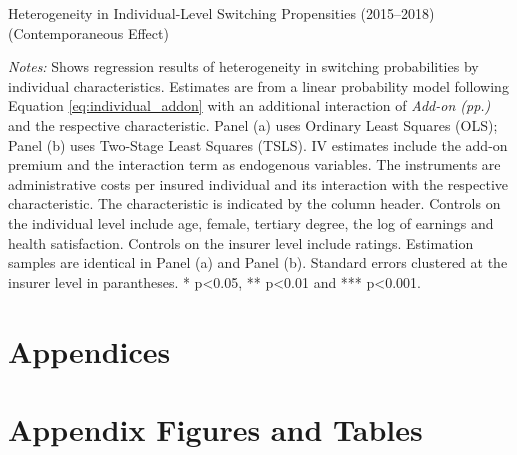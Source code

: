 \documentclass[a4paper, 11pt, english]{article}
\begin{document}
\begin{table}
	\captionsetup{justification=centering}
	\caption{Heterogeneity in Individual-Level Switching Propensities (2015--2018) \\ (Contemporaneous Effect)}
	
	\label{tab:individual15cont_het}
	\begin{minipage}{\textwidth}
		\vspace{3pt}
		\footnotesize \textit{Notes:} Shows regression results of heterogeneity in switching probabilities by individual characteristics. 
		Estimates are from a linear probability model following Equation \eqref{eq:individual_addon} with an additional interaction of \textit{Add-on (pp.)} and the respective characteristic. 
		Panel (a) uses Ordinary Least Squares (OLS); Panel (b) uses Two-Stage Least Squares (TSLS). IV estimates include the add-on premium and the interaction term as endogenous variables. The instruments are administrative costs per insured individual and its interaction with the respective characteristic. 
		The characteristic is indicated by the column header. Controls on the individual level include age, female, tertiary degree, the log of earnings and health satisfaction.  Controls on the insurer level include ratings. 
		Estimation samples are identical in Panel (a) and Panel (b). 
		Standard errors clustered at the insurer level in parantheses. * p<0.05, **  p<0.01 and *** p<0.001. 
	\end{minipage}
\end{table}
	
\clearpage 
\newpage 
\appendix

\section*{Appendices}

\renewcommand{\thesection}{\Alph{section}}
\renewcommand\thefigure{\thesection.\arabic{figure}}    
\setcounter{figure}{0} 

\renewcommand\thetable{\thesection.\arabic{table}}    
\setcounter{table}{0} 

\section{Appendix Figures and Tables \label{app:additionalresults}} 
\end{document}
